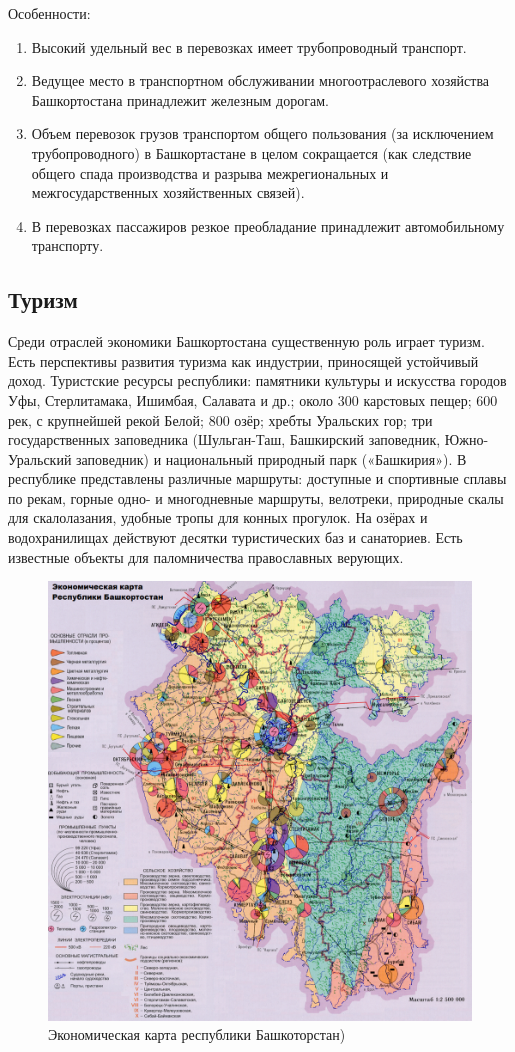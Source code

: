 Особенности:
\begin{enumerate}
\item Высокий удельный вес в перевозках имеет трубопроводный транспорт.
\item Ведущее место в транспортном обслуживании многоотраслевого хозяйства Башкортостана принадлежит железным дорогам.
\item Объем перевозок грузов транспортом общего пользования (за исключением трубопроводного) в Башкортастане в целом сокращается (как следствие общего спада производства и разрыва межрегиональных и межгосударственных хозяйственных связей).
\item В перевозках пассажиров резкое преобладание принадлежит автомобильному транспорту.
\end{enumerate}

\subsection{Туризм}

Среди отраслей экономики Башкортостана существенную роль играет туризм. Есть перспективы развития туризма как индустрии, приносящей устойчивый доход. Туристские ресурсы республики: памятники культуры и искусства городов Уфы, Стерлитамака, Ишимбая, Салавата и др.; около 300 карстовых пещер; 600 рек, с крупнейшей рекой Белой; 800 озёр; хребты Уральских гор; три государственных заповедника (Шульган-Таш, Башкирский заповедник, Южно-Уральский заповедник) и национальный природный парк («Башкирия»). В республике представлены различные маршруты: доступные и спортивные сплавы по рекам, горные одно- и многодневные маршруты, велотреки, природные скалы для скалолазания, удобные тропы для конных прогулок. На озёрах и водохранилищах действуют десятки туристических баз и санаториев. Есть известные объекты для паломничества православных верующих.

\newpage

\begin{figure}[h!]
\includegraphics[width=1\linewidth]{pics/sasha/economics}
\caption{Экономическая карта республики Башкоторстан)}\label{fig:economics}
\end{figure}

